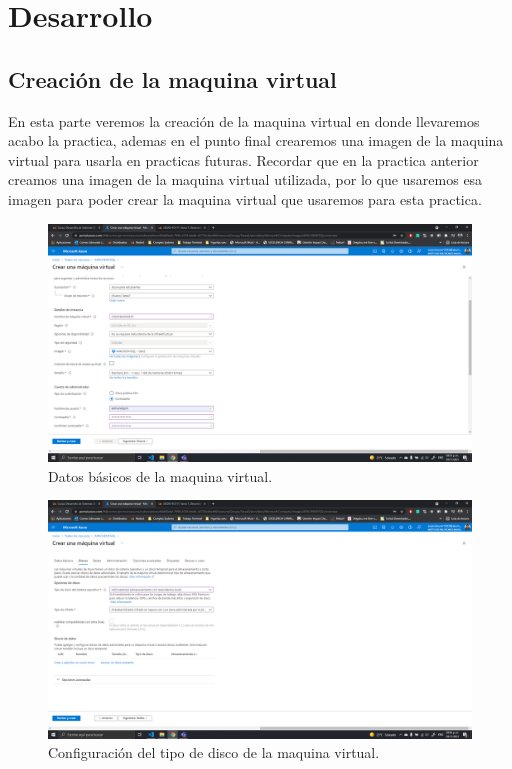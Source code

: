 \documentclass[11pt]{article}
\begin{document}
	\section{Desarrollo}
			\subsection{Creación de la maquina virtual}
En esta parte veremos la creación de la maquina virtual en donde llevaremos acabo la practica, ademas en el punto final crearemos una imagen de la maquina virtual para usarla en practicas futuras. Recordar que en la practica anterior creamos una imagen de la maquina virtual utilizada, por lo que usaremos esa imagen para poder crear la maquina virtual que usaremos para esta practica.
		\begin{figure}[H]
			\centering
			\includegraphics[scale=0.34]{resources/Infobasica.png}
			\caption{Datos básicos de la maquina virtual.}\label{fig:picture}
		\end{figure}
		\begin{figure}[H]
			\centering
			\includegraphics[scale=0.34]{resources/disco.png}
			\caption{Configuración del tipo de disco de la maquina virtual.}\label{fig:picture}
		\end{figure}
\end{document}
